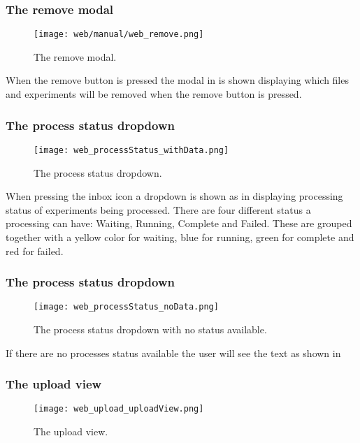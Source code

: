\subsubsection{The remove modal}
\begin{figure}[h]
\centering
\texttt{[image: web/manual/web\_remove.png]}
\caption{\label{fig:web_remove_removeFiles}The remove modal.}
\end{figure}
\FloatBarrier
When the remove button is pressed the modal in  is shown displaying which files and experiments will be removed when the remove button is pressed.

\subsubsection{The process status dropdown}
\begin{figure}[h]
\centering
\texttt{[image: web\_processStatus\_withData.png]}
\caption{\label{fig:web_processStatus_withData}The process status dropdown.}
\end{figure}
\FloatBarrier
When pressing the inbox icon a dropdown is shown as in displaying processing status of experiments being processed.
There are four different status a processing can have: Waiting, Running, Complete and Failed.
These are grouped together with a yellow color for waiting, blue for running, green for complete and red for failed.
\subsubsection{The process status dropdown}
\begin{figure}[h]
\centering
\texttt{[image: web\_processStatus\_noData.png]}
\caption{\label{fig:web_processStatus_noData}The process status dropdown with no status available.}
\end{figure}
\FloatBarrier

If there are no processes status available the user will see the text as shown in 

\subsubsection{The upload view}
\begin{sidewaysfigure}[h]
\centering
\texttt{[image: web\_upload\_uploadView.png]}
\caption{\label{fig:web_upload_uploadView}The upload view.}
\end{sidewaysfigure}

